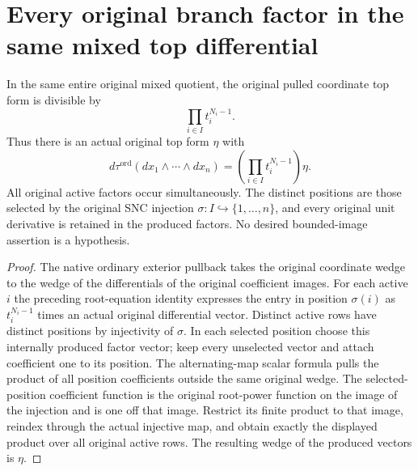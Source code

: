 \section{Every original branch factor in the same mixed top differential}

\begin{lemma}
\label{lem:kn-global-trace-native-mixed-bounded-wedge}
\leanok
In the same entire original mixed quotient, the original pulled coordinate
top form is divisible by
\[
 \prod_{i\in I} t_i^{N_i-1}.
\]
Thus there is an actual original top form $\eta$ with
\[
 d\tau^{\mathrm{ord}}(dx_1\wedge\cdots\wedge dx_n)
       =\left(\prod_{i\in I}t_i^{N_i-1}\right)\eta.
\]
All original active factors occur simultaneously.  The distinct positions
are those selected by the original SNC injection $\sigma:I\hookrightarrow
\{1,\ldots,n\}$, and every original unit derivative is retained in the
produced factors.  No desired bounded-image assertion is a hypothesis.
\end{lemma}
\begin{proof}
The native ordinary exterior pullback takes the original coordinate wedge
to the wedge of the differentials of the original coefficient images.
For each active $i$ the preceding root-equation identity expresses the
entry in position $\sigma(i)$ as $t_i^{N_i-1}$ times an actual original
differential vector.  Distinct active rows have distinct positions by
injectivity of $\sigma$.  In each selected position choose this internally
produced factor vector; keep every unselected vector and attach coefficient
one to its position.  The alternating-map scalar formula pulls the product
of all position coefficients outside the same original wedge.  The
selected-position coefficient function is the original root-power function
on the image of the injection and is one off that image.  Restrict its
finite product to that image, reindex through the actual injective map,
and obtain exactly the displayed product over all original active rows.
The resulting wedge of the produced vectors is $\eta$.
\end{proof}
